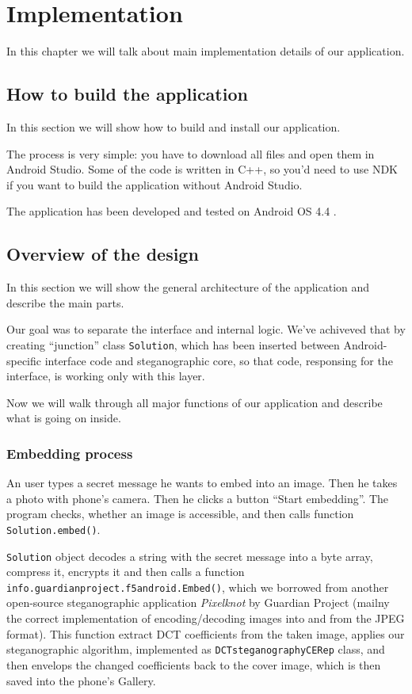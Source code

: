 \chapter{Implementation}
\label{ch:imple}

In this chapter we will talk about main implementation details of
our application.

\section{How to build the application}
In this section we will show how to build and install our application.

The process is very simple: you have to download all files and open them
in Android Studio. Some of the code is written in C++, so you'd need to 
use NDK if you want to build the application without Android Studio.

The application has been developed and tested on Android OS 4.4 .

\section{Overview of the design}
In this section we will show the general architecture of the application
and describe the main parts.

Our goal was to separate the interface and internal logic. We've achiveved that
by creating ``junction'' class \texttt{Solution}, which has been inserted between
Android-specific interface code and steganographic core, so that code, responsing for
the interface, is working only with this layer.

Now we will walk through all major functions of our application and describe what is going on inside.

\subsection{Embedding process}

An user types a secret message he wants to embed into an image. Then he takes a photo with 
phone's camera. Then he clicks a button ``Start embedding''. The program checks, whether 
an image is accessible, and then calls function \texttt{Solution.embed()}.

\texttt{Solution} object decodes a string with the secret message into a byte array,
compress it, encrypts it and then calls a function \texttt{info.guardianproject.f5android.Embed()},
which we borrowed from another open-source steganographic application \emph{Pixelknot} by Guardian
Project (mailny the correct implementation of encoding/decoding images into and from the JPEG format). 
This function extract DCT coefficients from the taken image,  applies our steganographic
algorithm, implemented as \texttt{DCTsteganographyCERep} class, and then envelops the changed coefficients
back to the cover image, which is then saved into the phone's Gallery.

